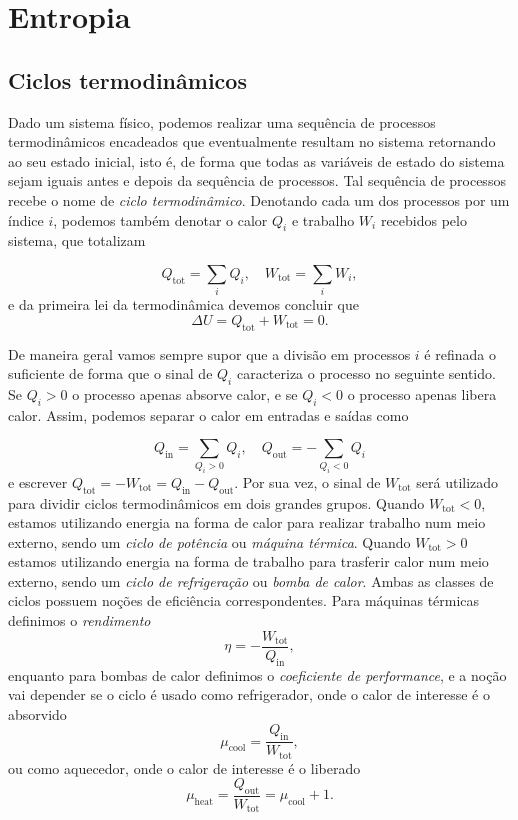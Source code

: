 \documentclass[a4paper, 12pt]{article}
\theoremstyle{definition}
\theoremstyle{definition}
\begin{document}
\section{Entropia}

\subsection{Ciclos termodinâmicos}

Dado um sistema físico, podemos realizar uma sequência de processos termodinâmicos encadeados que
eventualmente resultam no sistema retornando ao seu estado inicial, isto é, de forma que todas as variáveis
de estado do sistema sejam iguais antes e depois da sequência de processos. Tal sequência de processos
recebe o nome de \textit{ciclo termodinâmico}. Denotando cada um dos processos por um índice $i$, podemos
também denotar o calor $Q_i$ e trabalho $W_i$ recebidos pelo sistema, que totalizam

$$Q_\text{tot}=\sum_iQ_i,\quad W_\text{tot}=\sum_iW_i,$$
e da primeira lei da termodinâmica devemos concluir que
$$\Delta U=Q_\text{tot}+W_\text{tot}=0.$$

De maneira geral vamos sempre supor que a divisão em processos $i$ é refinada o suficiente de forma que
o sinal de $Q_i$ caracteriza o processo no seguinte sentido. Se $Q_i>0$ o processo apenas absorve calor, 
e se $Q_i<0$ o processo apenas libera calor. Assim, podemos separar o calor em entradas e saídas como

$$Q_\text{in}=\sum_{Q_i>0}Q_i,\quad Q_\text{out}=-\sum_{Q_i<0}Q_i$$
e escrever $Q_\text{tot}=-W_\text{tot}=Q_\text{in}-Q_\text{out}$. Por sua vez, o sinal de $W_\text{tot}$
será utilizado para dividir ciclos termodinâmicos em dois grandes grupos. Quando $W_\text{tot}<0$, estamos
utilizando energia na forma de calor para realizar trabalho num meio externo, sendo um \textit{ciclo de 
potência} ou \textit{máquina térmica}. Quando $W_\text{tot}>0$ estamos utilizando energia na forma de
trabalho para trasferir calor num meio externo, sendo um \textit{ciclo de refrigeração} ou \textit{bomba
de calor}. Ambas as classes de ciclos possuem noções de eficiência correspondentes. Para máquinas térmicas 
definimos o \textit{rendimento}
$$\eta=-\frac{W_\text{tot}}{Q_\text{in}},$$
enquanto para bombas de calor definimos o \textit{coeficiente de performance}, e a noção vai depender se o 
ciclo é usado como refrigerador, onde o calor de interesse é o absorvido
$$\mu_\text{cool}=\frac{Q_\text{in}}{W_\text{tot}},$$
ou como aquecedor, onde o calor de interesse é o liberado
$$\mu_\text{heat}=\frac{Q_\text{out}}{W_\text{tot}}=\mu_\text{cool}+1.$$
\end{document}
